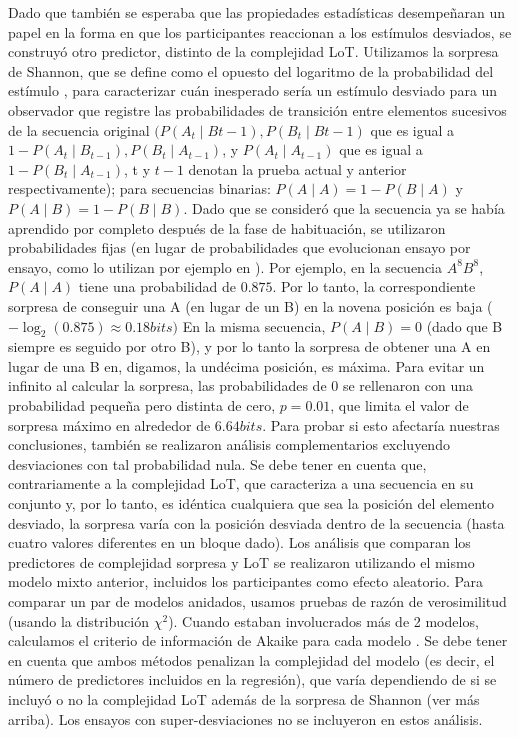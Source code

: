 Dado que también se esperaba que las propiedades estadísticas desempeñaran un papel en la forma en que los participantes reaccionan a los estímulos desviados, se construyó otro predictor, distinto de la complejidad LoT. Utilizamos la sorpresa de Shannon, que se define como el opuesto del logaritmo de la probabilidad del estímulo \cite{f21,f80,f82,f83,f84}, para caracterizar cuán inesperado sería un estímulo desviado para un observador que registre las probabilidades de transición entre elementos sucesivos de la secuencia original $(P(A_t \mid B{t-1 }), P(B_t \mid B{t-1})$ que es igual a $1 - P(A_t \mid B_{t-1}), P(B_t \mid A_{t-1})$, y $P(A_t \mid A_{t-1})$ que es igual a $1-P(B_t \mid A_{t-1})$, t y $t-1$ denotan la prueba actual y anterior respectivamente); para secuencias binarias: $P(A \mid A) = 1 - P (B \mid A)$ y $P(A \mid B) = 1 - P (B \mid B)$. Dado que se consideró que la secuencia ya se había aprendido por completo después de la fase de habituación, se utilizaron probabilidades fijas (en lugar de probabilidades que evolucionan ensayo por ensayo, como lo utilizan por ejemplo en \cite{f19,f20,f80}). Por ejemplo, en la secuencia $A^8B^8$, $P(A \mid A)$ tiene una probabilidad de $0.875$. Por lo tanto, la correspondiente sorpresa de conseguir una A (en lugar de un B) en la novena posición es baja ($-\log_2(0.875) \approx 0.18 bits)$ En la misma secuencia, $P(A \mid B) = 0$ (dado que B siempre es seguido por otro B), y por lo tanto la sorpresa de obtener una A en lugar de una B en, digamos, la undécima posición, es máxima. Para evitar un infinito al calcular la sorpresa, las probabilidades de 0 se rellenaron con una probabilidad pequeña pero distinta de cero, $p = 0.01$, que limita el valor de sorpresa máximo en alrededor de $6.64 bits$. Para probar si esto afectaría nuestras conclusiones, también se realizaron análisis complementarios excluyendo desviaciones con tal probabilidad nula. Se debe tener en cuenta que, contrariamente a la complejidad LoT, que caracteriza a una secuencia en su conjunto y, por lo tanto, es idéntica cualquiera que sea la posición del elemento desviado, la sorpresa varía con la posición desviada dentro de la secuencia (hasta cuatro valores diferentes en un bloque dado). Los análisis que comparan los predictores de complejidad sorpresa y LoT se realizaron utilizando el mismo modelo mixto anterior, incluidos los participantes como efecto aleatorio. Para comparar un par de modelos anidados, usamos pruebas de razón de verosimilitud (usando la distribución $\chi^2$). Cuando estaban involucrados más de 2 modelos, calculamos el criterio de información de Akaike para cada modelo \cite{f140}. Se debe tener en cuenta que ambos métodos penalizan la complejidad del modelo (es decir, el número de predictores incluidos en la regresión), que varía dependiendo de si se incluyó o no la complejidad LoT además de la sorpresa de Shannon (ver más arriba). Los ensayos con super-desviaciones no se incluyeron en estos análisis.

